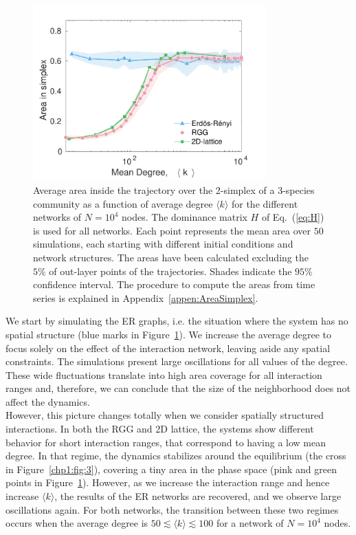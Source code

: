 \begin{figure}[t!]
    \centering
    \includegraphics[width=0.8\textwidth]{figures/chp1/fig4.pdf}
    \caption[Impact of average degree on the area in simplex]{Average area inside the trajectory over the 2-simplex of a 3-species community as a  function of average degree $\langle k \rangle$ for the different networks of $N = 10^4$ nodes. The dominance matrix $H$ of Eq.~(\ref{eq:H}) is used for all networks. Each point represents the mean area over $50$ simulations, each starting with different initial conditions and network structures. The areas have been calculated excluding the $5\%$ of out-layer points of the trajectories. Shades indicate the $95\%$ confidence interval. The procedure to compute the areas from time series is explained in Appendix~\ref{appen:AreaSimplex}.}
    \label{chp1:fig:4}
\end{figure}

We start by simulating the ER graphs, i.e. the situation where the system has no spatial structure (blue marks in Figure~\ref{chp1:fig:4}). We increase the average degree to focus solely on the effect of the interaction network, leaving aside any spatial constraints. The simulations present large oscillations for all values of the degree. These wide fluctuations translate into high area coverage for all interaction ranges and, therefore, we can conclude that the size of the neighborhood does not affect the dynamics. \\

However, this picture changes totally when we consider spatially structured interactions. In both the RGG and 2D lattice, the systems show different behavior for short interaction ranges, that correspond to having a low mean degree. In that regime, the dynamics stabilizes around the equilibrium (the cross in Figure~\ref{chp1:fig:3}), covering a tiny area in the phase space (pink and green points in Figure~\ref{chp1:fig:4}). However, as we increase the interaction range and hence increase $\langle k \rangle$, the results of the ER networks are recovered, and we observe large oscillations again. For both networks, the transition between these two regimes occurs when the average degree is $ 50 \lesssim \langle k \rangle \lesssim 100$ for a network of $N = 10^4$ nodes.
 
